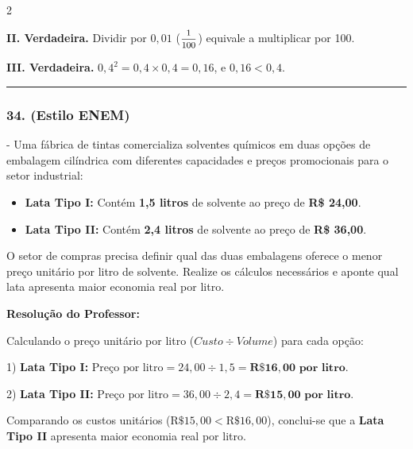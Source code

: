 \begin{multicols*}{2}
\begin{tcolorbox}[colback=CorTitUm!5, colframe=CorTitUm, boxrule=1pt, arc=4pt, left=6pt, right=6pt, top=6pt, bottom=6pt]
    \textbf{II. Verdadeira.} Dividir por $0,01$ ($\mfrac{1}{100}$) equivale a multiplicar por 100.
    
    \textbf{III. Verdadeira.} $0,4^2 = 0,4 \times 0,4 = 0,16$, e $0,16 < 0,4$.
    \end{tcolorbox}
\fi

\par\vspace{\espacoQuestao}

\noindent\textcolor{CorLinha}{\rule{\linewidth}{0.5pt}} 
\par\vspace{\espacoPreQuestao}
\subsubsection*{34. (Estilo ENEM)} - Uma fábrica de tintas comercializa solventes químicos em duas opções de embalagem cilíndrica com diferentes capacidades e preços promocionais para o setor industrial:
\begin{itemize}[itemsep=\espacoAlt]
    \item \textbf{Lata Tipo I:} Contém \textbf{1,5 litros} de solvente ao preço de \textbf{R\$ 24,00}.
    \item \textbf{Lata Tipo II:} Contém \textbf{2,4 litros} de solvente ao preço de \textbf{R\$ 36,00}.
    \end{itemize}

O setor de compras precisa definir qual das duas embalagens oferece o menor preço unitário por litro de solvente. Realize os cálculos necessários e aponte qual lata apresenta maior economia real por litro.

\ifgabarito
    \begin{tcolorbox}[colback=CorTitUm!5, colframe=CorTitUm, boxrule=1pt, arc=4pt, left=6pt, right=6pt, top=6pt, bottom=6pt]
    \small\textbf{\textcolor{CorTitUm}{Resolução do Professor:}}\par\vspace{0.1cm}
    \color{CinzaEscuro}
    Calculando o preço unitário por litro ($Custo \div Volume$) para cada opção:
    
    1) \textbf{Lata Tipo I:}
    $\text{Preço por litro} = 24,00 \div 1,5 = \mathbf{\text{R\$ } 16,00\text{ por litro}}$.
    
    2) \textbf{Lata Tipo II:}
    $\text{Preço por litro} = 36,00 \div 2,4 = \mathbf{\text{R\$ } 15,00\text{ por litro}}$.
    
    Comparando os custos unitários ($\text{R\$ } 15,00 < \text{R\$ } 16,00$), conclui-se que a \textbf{Lata Tipo II} apresenta maior economia real por litro.
    \end{tcolorbox}
\fi


\end{multicols*}

